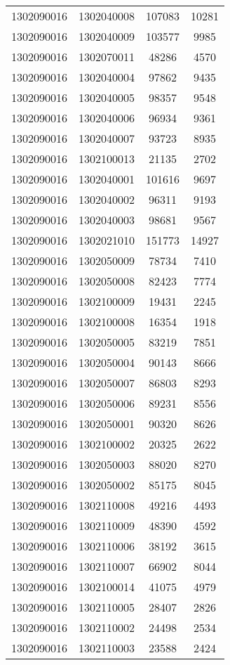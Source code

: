 \begin{longtable}[h]{llcc}
		1302090016 & 1302040008 & 107083 & 10281\\
		1302090016 & 1302040009 & 103577 & 9985\\
		1302090016 & 1302070011 & 48286 & 4570\\
		1302090016 & 1302040004 & 97862 & 9435\\
		1302090016 & 1302040005 & 98357 & 9548\\
		1302090016 & 1302040006 & 96934 & 9361\\
		1302090016 & 1302040007 & 93723 & 8935\\
		1302090016 & 1302100013 & 21135 & 2702\\
		1302090016 & 1302040001 & 101616 & 9697\\
		1302090016 & 1302040002 & 96311 & 9193\\
		1302090016 & 1302040003 & 98681 & 9567\\
		1302090016 & 1302021010 & 151773 & 14927\\
		1302090016 & 1302050009 & 78734 & 7410\\
		1302090016 & 1302050008 & 82423 & 7774\\
		1302090016 & 1302100009 & 19431 & 2245\\
		1302090016 & 1302100008 & 16354 & 1918\\
		1302090016 & 1302050005 & 83219 & 7851\\
		1302090016 & 1302050004 & 90143 & 8666\\
		1302090016 & 1302050007 & 86803 & 8293\\
		1302090016 & 1302050006 & 89231 & 8556\\
		1302090016 & 1302050001 & 90320 & 8626\\
		1302090016 & 1302100002 & 20325 & 2622\\
		1302090016 & 1302050003 & 88020 & 8270\\
		1302090016 & 1302050002 & 85175 & 8045\\
		1302090016 & 1302110008 & 49216 & 4493\\
		1302090016 & 1302110009 & 48390 & 4592\\
		1302090016 & 1302110006 & 38192 & 3615\\
		1302090016 & 1302110007 & 66902 & 8044\\
		1302090016 & 1302100014 & 41075 & 4979\\
		1302090016 & 1302110005 & 28407 & 2826\\
		1302090016 & 1302110002 & 24498 & 2534\\
		1302090016 & 1302110003 & 23588 & 2424\\

\end{longtable}
